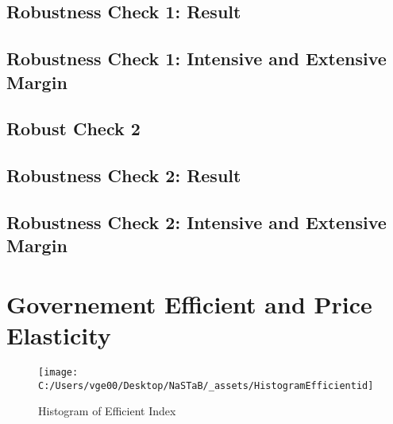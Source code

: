 \documentclass[ review  , 3p ]{elsarticle}
\begin{document}
  \hypertarget{robustness-check-1-result}{%
  \subsection{Robustness Check 1: Result}\label{robustness-check-1-result}}
  
  \hypertarget{robustness-check-1-intensive-and-extensive-margin}{%
  \subsection{Robustness Check 1: Intensive and Extensive Margin}\label{robustness-check-1-intensive-and-extensive-margin}}
  
  \hypertarget{robust-check-2}{%
  \subsection{Robust Check 2}\label{robust-check-2}}
  
  \hypertarget{robustness-check-2-result}{%
  \subsection{Robustness Check 2: Result}\label{robustness-check-2-result}}
  
  \hypertarget{robustness-check-2-intensive-and-extensive-margin}{%
  \subsection{Robustness Check 2: Intensive and Extensive Margin}\label{robustness-check-2-intensive-and-extensive-margin}}
  
  \hypertarget{governement-efficient-and-price-elasticity}{%
  \section{Governement Efficient and Price Elasticity}\label{governement-efficient-and-price-elasticity}}
  
  \begin{figure}
  
  {\centering \texttt{[image: C:/Users/vge00/Desktop/NaSTaB/\_assets/HistogramEfficientid]} 
  
  }
  
  \caption{Histogram of Efficient Index}\label{fig:unnamed-chunk-1}
  \end{figure}
  
\end{document}

